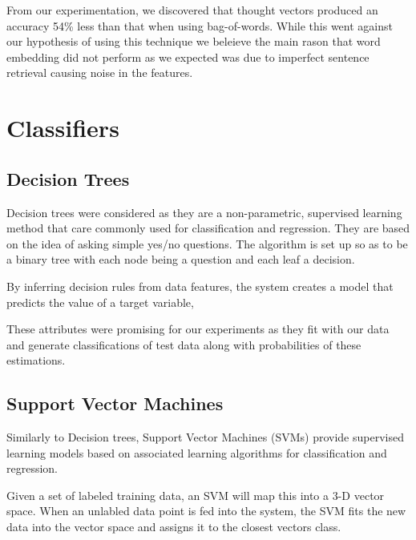 \documentclass[bsc,frontabs,twoside,singlespacing,parskip,deptreport]{infthesis}     %
\begin{document}


From our experimentation, we discovered that thought vectors produced an accuracy 54\% less than that when
using bag-of-words. While this went against our hypothesis of using this technique we beleieve
the main rason that word embedding did not perform as we expected was due to imperfect sentence retrieval causing noise in
the features.

\section{Classifiers}
\subsection{Decision Trees}
Decision trees were considered as they are a non-parametric, supervised learning method that care commonly used for
classification and regression.
They are based on the idea of asking simple yes/no questions. The algorithm is set up so as to be a binary tree with
each node being a question and each leaf a decision.

By inferring decision rules from data features, the system creates a model that predicts the value of a target variable,

These attributes were promising for our experiments as they fit with our data and generate
classifications of test data along with probabilities of these estimations.


\subsection{Support Vector Machines}
Similarly to Decision trees, Support Vector Machines (SVMs) provide supervised learning models based on
associated learning algorithms for classification and regression.

Given a set of labeled training data, an SVM will map this into a 3-D vector space.
When an unlabled data point is fed into the system, the SVM fits the new data into the vector space and
assigns  it to the closest vectors class.
\end{document}
